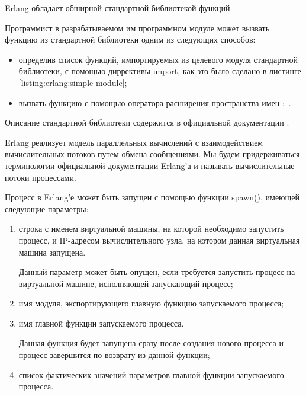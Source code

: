 
Erlang обладает обширной стандартной библиотекой функций.

Программист в разрабатываемом им программном модуле может вызвать функцию из стандартной библиотеки одним из следующих способов:

\begin{itemize}

	\item определив список функций, импортируемых из целевого модуля стандартной библиотеки, с помощью диррективы import, как это было сделано в листинге \ref{listing:erlang:simple-module};
	\item вызвать функцию с помощью оператора расширения пространства имен :~.

\end{itemize}

Описание стандартной библиотеки содержится в официальной документации \cite{erlang-doc}.


Erlang реализует модель параллельных вычислений с взаимодействием вычислительных потоков путем обмена сообщениями. Мы будем придерживаться терминологии официальной документации Erlang'а и называть вычислительные потоки процессами.

Процесс в Erlang'е может быть запущен с помощью функции spawn(), имеющей следующие параметры:

\begin{enumerate}

	\item строка с именем виртуальной машины, на которой необходимо запустить процесс, и IP-адресом вычислительного узла, на котором данная виртуальная машина запущена.

	Данный параметр может быть опущен, если требуется запустить процесс на виртуальной машине, исполняющей запускающий процесс;

	\item имя модуля, экспортирующего главную функцию запускаемого процесса;

	\item имя главной функции запускаемого процесса.

	Данная функция будет запущена сразу после создания нового процесса и процесс завершится по возврату из данной функции;

	\item список фактических значений параметров главной функции запускаемого процесса.

\end{enumerate}

